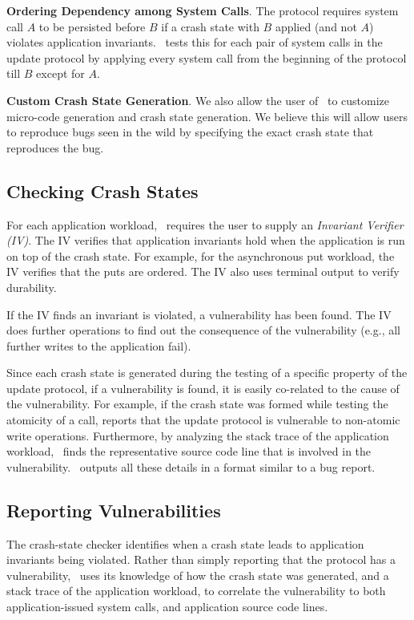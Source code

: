 \textbf{Ordering Dependency among System Calls}. The protocol requires system
call $A$ to be persisted before $B$ if a crash state with $B$ applied (and not
$A$) violates application invariants. \toolname\ tests this for each pair of
system calls in the update protocol by applying every system call from the
beginning of the protocol till $B$ except for $A$.   

\textbf{Custom Crash State Generation}. We also allow the user of \toolname\ to customize micro-code
generation and crash state generation. We believe this will allow users to
reproduce bugs seen in the wild by specifying the exact crash state that
reproduces the bug.    

\subsection{Checking Crash States}
\label{sec-checker}
For each application workload, \toolname\ requires the user to supply an
\textit{Invariant Verifier (IV)}. The IV verifies that application invariants
hold when the application is run on top of the crash state. For example, for
the  asynchronous put workload, the IV verifies that the puts
are ordered. The IV also uses terminal output to verify durability. 

If the IV finds an invariant is violated, a vulnerability has been found. The
IV does further operations to find out the consequence of the vulnerability
(e.g., all further writes to the application fail).

Since each crash state is generated during the testing of a specific property
of the update protocol, if a vulnerability is found, it is easily co-related to
the cause of the vulnerability. For example, if the crash state was formed
while testing the atomicity of a  call, \toolname reports that the
update protocol is vulnerable to non-atomic write operations. Furthermore, by
analyzing the stack trace of the application workload, \toolname\ finds the
representative source code line that is involved in the vulnerability.
\toolname\ outputs all these details in a format similar to a bug report.   

\subsection{Reporting Vulnerabilities}
\label{sec-vul-report}
The crash-state checker identifies when a crash state leads to application
invariants being violated. Rather than simply reporting that the protocol has
a vulnerability, \toolname\ uses its knowledge of how the crash state was
generated, and a stack trace of the application workload, to correlate the
vulnerability to both application-issued system calls, and application source
code lines.

